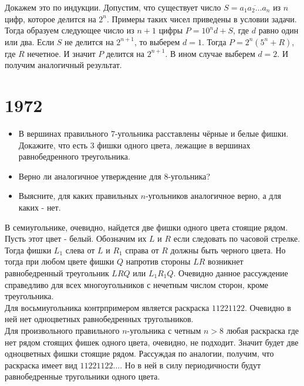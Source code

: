 \documentclass[11pt, a4paper]{template}
\begin{document}
\begin{solution}
Докажем это по индукции. Допустим, что существует число $S = \overline{a_{1}a_{2}\dots a_{n}}$ из $n$ цифр, которое делится на $2^{n}$. Примеры таких чисел приведены в условии задачи. Тогда образуем следующее число из $n + 1$ цифры $P = 10^{n} d + S$, где $d$ равно один или два. Если $S$ не делится на $2^{n+1}$, то выберем $d = 1$. Тогда $P = 2^{n}(5^{n} + R)$, где $R$ нечетное. И значит $P$ делится на $2^{n+1}$. В ином случае выберем $d = 2$. И получим аналогичный результат.
\end{solution}


\chapter{1972}

\begin{exercise}[M146]
\begin{itemize}
\item В вершинах правильного 7-угольника расставлены чёрные и белые фишки. Докажите, что есть 3 фишки одного цвета, лежащие в вершинах равнобедренного треугольника.
\item Верно ли аналогичное утверждение для 8-угольника?
\item Выясните, для каких правильных $n$-угольников аналогичное верно, а для каких - нет.
\end{itemize}
\end{exercise}

\begin{solution}
В семиугольнике, очевидно, найдется две фишки одного цвета стоящие рядом. Пусть этот цвет - белый. Обозначим их $L$ и $R$ если следовать по часовой стрелке. Тогда фишки $L_{1}$ слева от $L$ и $R_{1}$ справа от $R$ должны быть черного цвета. Но тогда при любом цвете фишки $Q$ напротив стороны $LR$  возникнет равнобедренный треугольник $LRQ$ или $L_{1}R_{1}Q$. Очевидно данное рассуждение справедливо для всех многоугольников с нечетным числом сторон, кроме треугольника. \\
Для восьмиугольника контрпримером является раскраска $11221122$. Очевидно в ней нет одноцветных равнобедренных тругольников. \\
Для произвольного правильного $n$-угольника с четным $n > 8$ любая раскраска где нет рядом стоящих фишек одного цвета, очевидно, не подходит. Значит будет две одноцветных фишки стоящие рядом. Рассуждая по аналогии, получим, что раскраска имеет вид $11221122\dots$. Но в ней в силу периодичности будут равнобедренные тругольники одного цвета.
\end{solution}
\end{document}
